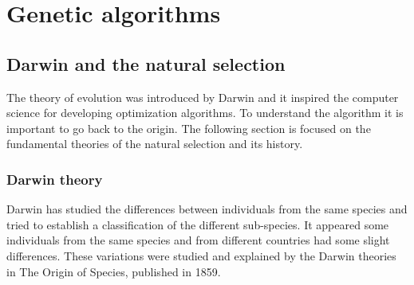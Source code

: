 \chapter{Genetic algorithms }\label{chap:EA}

\minitoc


\section{Darwin and the natural selection }

The theory of evolution was introduced by Darwin and it inspired the computer science for developing optimization algorithms. To understand the algorithm it is important to go back to the origin.
The following  section is  focused on the fundamental theories of the  natural selection and its history. 
\subsection{Darwin theory } \label{sec:GA}

Darwin has studied the differences between individuals from the same species and tried to establish a classification of the different sub-species. It appeared some individuals from the same species and from different countries had some slight differences. These variations were studied and explained by the Darwin theories in The Origin of Species, published in 1859. 

